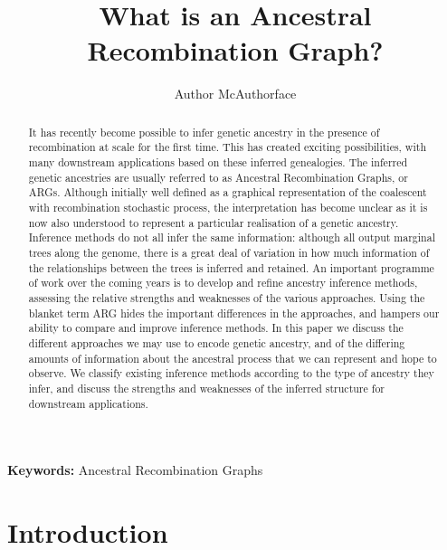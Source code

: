 \documentclass{article}
\begin{document}
\linenumbers
\title{What is an Ancestral Recombination Graph?}
\author{Author McAuthorface}

\maketitle

\begin{abstract}
It has recently become possible to infer genetic ancestry in the presence of
recombination at scale for the first time. This has created exciting
possibilities, with many downstream applications based on
these inferred genealogies. The inferred genetic ancestries are usually
referred to as Ancestral Recombination Graphs, or ARGs. Although initially well
defined as a graphical representation of the coalescent with recombination
stochastic process, the interpretation has become unclear as it is now
also understood to represent a particular realisation of a genetic
ancestry.
Inference methods do not all infer the same information:
although all output marginal trees along the genome, there is a great deal of
variation in how much information of the relationships between the trees is inferred
and retained. An important programme of work over the coming years is to
develop and refine ancestry inference methods, assessing the relative strengths
and weaknesses of the various approaches. Using the blanket term ARG hides the
important differences in the approaches, and hampers our ability to compare and
improve inference methods. In this paper we discuss the different approaches we
may use to encode genetic ancestry, and of the differing amounts of information
about the ancestral process that we can represent and hope to observe. We
classify existing inference methods according to the type of ancestry they
infer, and discuss the strengths and weaknesses of the inferred structure for
downstream applications.
\end{abstract}

\textbf{Keywords:} Ancestral Recombination Graphs

\section*{Introduction}

\end{document}
